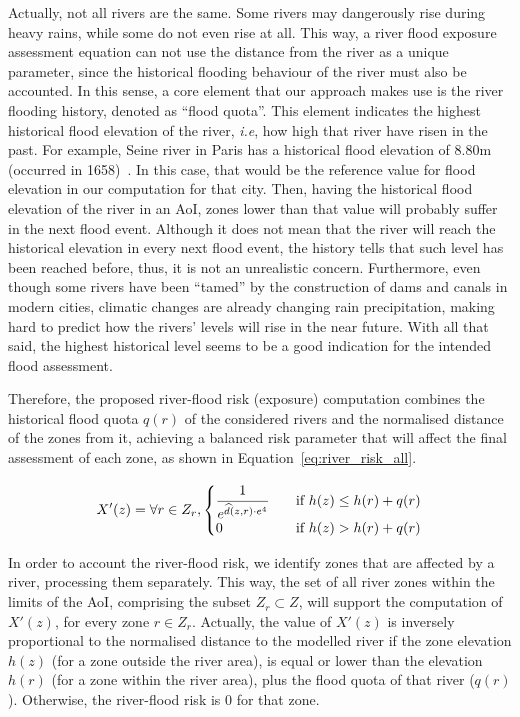 \begin{refsection}
Actually, not all rivers are the same. Some rivers may dangerously rise during heavy rains, while some do not even rise at all. This way, a river flood exposure assessment equation can not use the distance from the river as a unique parameter, since the historical flooding behaviour of the river must also be accounted. In this sense, a core element that our approach makes use is the river flooding history, denoted as ``flood quota''. This element indicates the highest historical flood elevation of the river, \textit{i.e}, how high that river have risen in the past. For example, Seine river in Paris has a historical flood elevation of 8.80m (occurred in 1658)~\cite{flood_seine}. In this case, that would be the reference value for flood elevation in our computation for that city. Then, having the historical flood elevation of the river in an AoI, zones lower than that value will probably suffer in the next flood event. Although it does not mean that the river will reach the historical elevation in every next flood event, the history tells that such level has been reached before, thus, it is not an unrealistic concern. Furthermore, even though some rivers have been ``tamed'' by the construction of dams and canals in modern cities, climatic changes are already changing rain precipitation, making hard to predict how the rivers' levels will rise in the near future. With all that said, the highest historical level seems to be a good indication for the intended flood assessment. 

Therefore, the proposed river-flood risk (exposure) computation combines the historical flood quota $q(r)$ of the considered rivers and the normalised distance of the zones from it, achieving a balanced risk parameter that will affect the final assessment of each zone, as shown in Equation~\ref{eq:river_risk_all}.

\begin{equation}
    \label{eq:river_risk_all}
    \begin{split}
        X'(z) = \forall r \in Z_r, 
        \begin{cases}
            \cfrac{1}{e^{\widehat{d}(z, r) \cdot e^4}}    & \quad \text{if } h(z) \leq h(r) + q(r) \\
            0                                             & \quad \text{if } h(z) > h(r) + q(r)
        \end{cases}
    \end{split}
\end{equation}

In order to account the river-flood risk, we identify zones that are affected by a river, processing them separately. This way, the set of all river zones within the limits of the AoI, comprising the subset $Z_r \subset Z$, will support the computation of $X'(z)$, for every zone $r \in Z_r$. Actually, the value of $X'(z)$ is inversely proportional to the normalised distance to the modelled river if the zone elevation $h(z)$ (for a zone outside the river area), is equal or lower than the elevation $h(r)$ (for a zone within the river area), plus the flood quota of that river ($q(r)$). Otherwise, the river-flood risk is 0 for that zone. 


\end{refsection}

